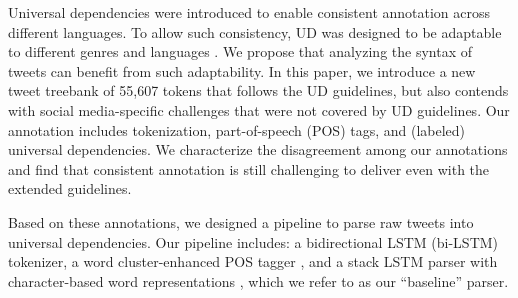 \documentclass[11pt,a4paper]{article}
\newcommand{\yjcomment}[1]{\textcolor{orange}{[$_\mathrm{L}^\mathrm{Y}$#1]}}
\newcommand{\nascomment}[1]{\textcolor{blue}{[#1 ---\textsc{nas}]}}
\begin{document}

Universal dependencies \citep[UD]{NIVRE16.348} were introduced to enable
consistent annotation across different languages. To allow such
consistency, UD was designed to be adaptable to different genres and languages
\cite{guo-EtAl:2015:ACL-IJCNLP2,TACL892}. We propose that analyzing
the syntax of tweets can benefit from such adaptability. In this paper,
we introduce a new tweet treebank of 55,607 tokens that follows the UD
guidelines, but also contends with social media-specific challenges that were not
covered by UD guidelines. Our annotation includes 
tokenization, part-of-speech (POS) tags, and (labeled) universal dependencies.
We characterize the disagreement among our annotations and find that
consistent annotation is still challenging to deliver even with
the extended guidelines.


Based on these annotations, we designed a pipeline to parse 
raw tweets into universal dependencies. Our pipeline includes: a
bidirectional LSTM (bi-LSTM) tokenizer, a word cluster-enhanced POS
tagger \citep[following][]{owoputi-EtAl:2013:NAACL-HLT}, and a stack LSTM parser
with character-based word representations
\cite{ballesteros-dyer-smith:2015:EMNLP}, which we refer to as our
``baseline'' parser.
\end{document}
